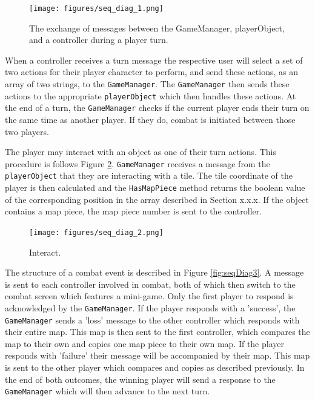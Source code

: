 \begin{figure}
	\centering	
	\texttt{[image: figures/seq\_diag\_1.png]}
	\caption{The exchange of messages between the GameManager, playerObject, and a controller during a player turn.\label{fig:seqDiagram1}}
\end{figure}

When a controller receives a turn message the respective user will select a set of two actions for their player character to perform, and send these actions, as an array of two strings, to the \texttt{GameManager}. The \texttt{GameManager} then sends these actions to the appropriate \texttt{playerObject} which then handles these actions. At the end of a turn, the \texttt{GameManager} checks if the current player ends their turn on the same time as another player. If they do, combat is initiated between those two players.

The player may interact with an object as one of their turn actions. This procedure is follows Figure \ref{fig:seqDiag2}. \texttt{GameManager} receives a message from the \texttt{playerObject} that they are interacting with a tile. The tile coordinate of the player is then calculated and the \texttt{HasMapPiece} method returns the boolean value of the corresponding position in the array described in Section x.x.x. If the object contains a map piece, the map piece number is sent to the controller.

\begin{figure}
	\centering
	\texttt{[image: figures/seq\_diag\_2.png]}
	\caption{Interact. \label{fig:seqDiag2}}
\end{figure}

The structure of a combat event is described in Figure \ref{fig:seqDiag3}. A message is sent to each controller involved in combat, both of which then switch to the combat screen which features a mini-game. Only the first player to respond is acknowledged by the \texttt{GameManager}. If the player responds with a 'success', the \texttt{GameManager} sends a 'loss' message to the other controller which responds with their entire map. This map is then sent to the first controller, which compares the map to their own and copies one map piece to their own map. If the player responds with 'failure' their message will be accompanied by their map. This map is sent to the other player which compares and copies as described previously. In the end of both outcomes, the winning player will send a response to the \texttt{GameManager} which will then advance to the next turn.

